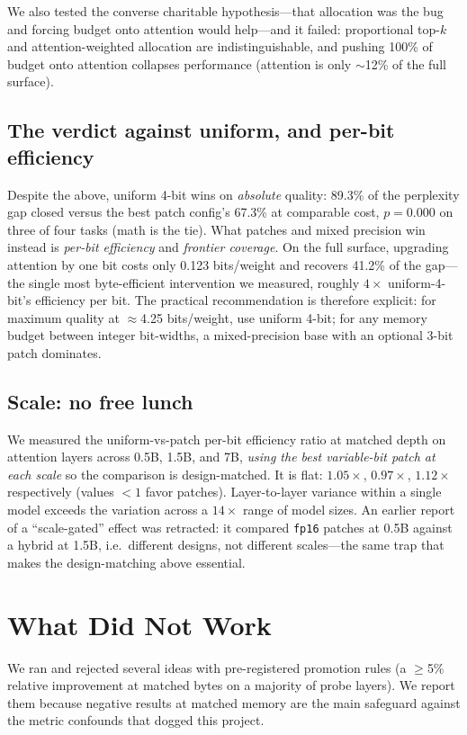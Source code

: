 \documentclass[manuscript, screen, review]{jair}
\newcommand{\bpw}{bits/weight}
\newcommand{\code}[1]{\texttt{#1}}
\begin{document}
We also tested the converse charitable hypothesis---that allocation was the
bug and forcing budget onto attention would help---and it failed: proportional
top-$k$ and attention-weighted allocation are indistinguishable, and pushing
100\% of budget onto attention collapses performance (attention is only
$\sim$12\% of the full surface).

\subsection{The verdict against uniform, and per-bit efficiency}
Despite the above, uniform 4-bit wins on \emph{absolute} quality: 89.3\% of the
perplexity gap closed versus the best patch config's 67.3\% at comparable cost,
$p{=}0.000$ on three of four tasks (math is the tie). What patches and mixed
precision win instead is \emph{per-bit efficiency} and \emph{frontier
coverage}. On the full surface, upgrading attention by one bit costs only
0.123 \bpw{} and recovers 41.2\% of the gap---the single most byte-efficient
intervention we measured, roughly $4\times$ uniform-4-bit's efficiency per
bit. The practical recommendation is therefore explicit: for maximum quality
at $\approx$4.25 \bpw{}, use uniform 4-bit; for any memory budget between
integer bit-widths, a mixed-precision base with an optional 3-bit patch
dominates.

\subsection{Scale: no free lunch}
\label{sec:scale}
We measured the uniform-vs-patch per-bit efficiency ratio at matched depth on
attention layers across 0.5B, 1.5B, and 7B, \emph{using the best variable-bit
patch at each scale} so the comparison is design-matched. It is flat:
$1.05\times$, $0.97\times$, $1.12\times$ respectively (values $<1$ favor
patches). Layer-to-layer variance within a single model exceeds the variation
across a $14\times$ range of model sizes. An earlier report of a
``scale-gated'' effect was retracted: it compared \code{fp16} patches at 0.5B
against a hybrid at 1.5B, i.e.\ different designs, not different scales---the
same trap that makes the design-matching above essential.

\section{What Did Not Work}
\label{sec:negative}
We ran and rejected several ideas with pre-registered promotion rules
(a $\geq$5\% relative improvement at matched bytes on a majority of probe
layers). We report them because negative results at matched memory are the
main safeguard against the metric confounds that dogged this project.
\end{document}

